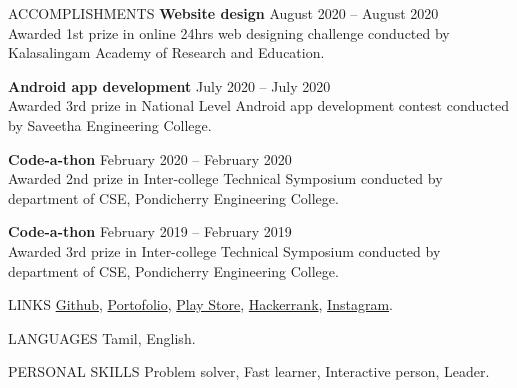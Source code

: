 \documentclass{template}
\begin{document}
\begin{rSection}{ACCOMPLISHMENTS}
\textbf{Website design} \hfill August 2020 – August 2020 \\
Awarded 1st prize in online 24hrs web designing challenge conducted by Kalasalingam Academy of Research and Education.

\textbf{Android app development} \hfill July 2020 – July 2020 \\
Awarded 3rd prize in National Level Android app development contest conducted by Saveetha Engineering College.

\textbf{Code-a-thon} \hfill February 2020 – February 2020 \\
Awarded 2nd prize in Inter-college Technical Symposium conducted by department of CSE, Pondicherry Engineering College.

\textbf{Code-a-thon} \hfill February 2019 – February 2019 \\
Awarded 3rd prize in Inter-college Technical Symposium conducted by department of CSE, Pondicherry Engineering College.

\end{rSection}

\begin{rSection}{LINKS}
\href{https://github.com/princesanjivy}{Github},
\href{https://princesanjivy-portfolio.web.app/}{Portofolio},
\href{https://play.google.com/store/apps/dev?id=6439925551269057866}{Play Store},
\href{https://www.hackerrank.com/profile/sanjivy_android}{Hackerrank},
\href{https://www.instagram.com/princesanjivy}{Instagram}.

\end{rSection}

\begin{rSection}{LANGUAGES}
Tamil, English.

\end{rSection}

\begin{rSection}{PERSONAL SKILLS}
Problem solver, Fast learner, Interactive person, Leader.

\end{rSection}
\end{document}
